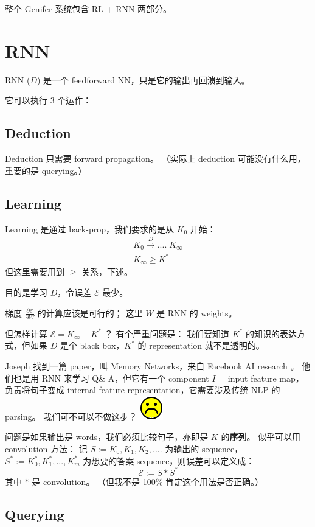 \documentclass[12pt]{article}
\newcommand*\sadface{\includegraphics[scale=0.25]{face-sad.png}}
\begin{document}
整个 Genifer 系统包含 RL + RNN 两部分。

\section{RNN}

RNN ($D$) 是一个 feedforward NN，只是它的输出再回溃到输入。


它可以执行 3 个运作：

\subsection{Deduction}

Deduction 只需要 forward propagation。  （实际上 deduction 可能没有什么用，重要的是 querying。）

\subsection{Learning}

Learning 是通过 back-prop，我们要求的是从 $K_0$ 开始：
\begin{eqnarray}
K_0 \stackrel{D}{\longrightarrow} .... \; K_\infty \nonumber \\
K_\infty \ge K^*
\end{eqnarray}
但这里需要用到 $\ge$ 关系，下述。

目的是学习 $D$，令误差 $\mathcal{E}$ 最少。

梯度 $\frac{\partial \mathcal{E}}{\partial W}$ 的计算应该是可行的； 这里 $W$ 是 RNN 的 weights。

但怎样计算 $\mathcal{E} = K_\infty - K^*$ ？  有个严重问题是： 我们要知道 $K^*$ 的知识的表达方式，但如果 $D$ 是个 black box，$K^*$ 的 representation 就不是透明的。

Joseph 找到一篇 paper，叫 Memory Networks，来自 Facebook AI research \cite{Weston2015}。 他们也是用 RNN 来学习 Q\& A，但它有一个 component $I$ = input feature map，负责将句子变成 internal feature representation，它需要涉及传统 NLP 的 parsing。 我们可不可以不做这步？ \sadface

问题是如果输出是 words，我们必须比较句子，亦即是 $K$ 的\textbf{序列}。 似乎可以用 convolution 方法： 记 $S := K_0, K_1, K_2, ....$ 为输出的 sequence，$S^* := K^*_0, K^*_1, ..., K^*_m $ 为想要的答案 sequence，则误差可以定义成：
$$ \mathcal{E} := S * S^* $$
其中 $*$ 是 convolution。 （但我不是 100\% 肯定这个用法是否正确。）

\subsection{Querying}
\end{document}
